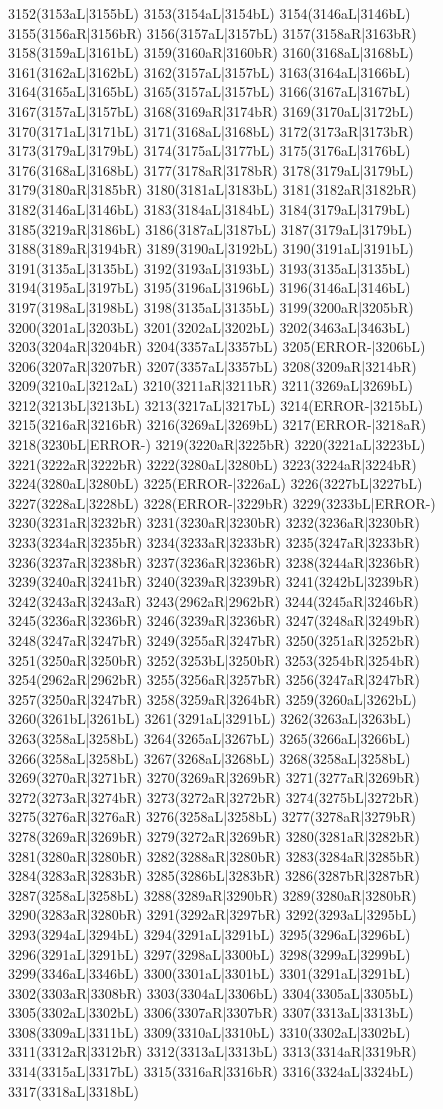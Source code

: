 3152(3153aL|3155bL) 3153(3154aL|3154bL) 3154(3146aL|3146bL) 3155(3156aR|3156bR) 3156(3157aL|3157bL) 3157(3158aR|3163bR) 3158(3159aL|3161bL) 3159(3160aR|3160bR) 3160(3168aL|3168bL) 3161(3162aL|3162bL) 3162(3157aL|3157bL) 3163(3164aL|3166bL) 3164(3165aL|3165bL) 3165(3157aL|3157bL) 3166(3167aL|3167bL) 3167(3157aL|3157bL) 3168(3169aR|3174bR) 3169(3170aL|3172bL) 3170(3171aL|3171bL) 3171(3168aL|3168bL) 3172(3173aR|3173bR) 3173(3179aL|3179bL) 3174(3175aL|3177bL) 3175(3176aL|3176bL) 3176(3168aL|3168bL) 3177(3178aR|3178bR) 3178(3179aL|3179bL) 3179(3180aR|3185bR) 3180(3181aL|3183bL) 3181(3182aR|3182bR) 3182(3146aL|3146bL) 3183(3184aL|3184bL) 3184(3179aL|3179bL) 3185(3219aR|3186bL) 3186(3187aL|3187bL) 3187(3179aL|3179bL) 3188(3189aR|3194bR) 3189(3190aL|3192bL) 3190(3191aL|3191bL) 3191(3135aL|3135bL) 3192(3193aL|3193bL) 3193(3135aL|3135bL) 3194(3195aL|3197bL) 3195(3196aL|3196bL) 3196(3146aL|3146bL) 3197(3198aL|3198bL) 3198(3135aL|3135bL) 3199(3200aR|3205bR) 3200(3201aL|3203bL) 3201(3202aL|3202bL) 3202(3463aL|3463bL) 3203(3204aR|3204bR) 3204(3357aL|3357bL) 3205(ERROR-|3206bL) 3206(3207aR|3207bR) 3207(3357aL|3357bL) 3208(3209aR|3214bR) 3209(3210aL|3212aL) 3210(3211aR|3211bR) 3211(3269aL|3269bL) 3212(3213bL|3213bL) 3213(3217aL|3217bL) 3214(ERROR-|3215bL) 3215(3216aR|3216bR) 3216(3269aL|3269bL) 3217(ERROR-|3218aR) 3218(3230bL|ERROR-) 3219(3220aR|3225bR) 3220(3221aL|3223bL) 3221(3222aR|3222bR) 3222(3280aL|3280bL) 3223(3224aR|3224bR) 3224(3280aL|3280bL) 3225(ERROR-|3226aL) 3226(3227bL|3227bL) 3227(3228aL|3228bL) 3228(ERROR-|3229bR) 3229(3233bL|ERROR-) 3230(3231aR|3232bR) 3231(3230aR|3230bR) 3232(3236aR|3230bR) 3233(3234aR|3235bR) 3234(3233aR|3233bR) 3235(3247aR|3233bR) 3236(3237aR|3238bR) 3237(3236aR|3236bR) 3238(3244aR|3236bR) 3239(3240aR|3241bR) 3240(3239aR|3239bR) 3241(3242bL|3239bR) 3242(3243aR|3243aR) 3243(2962aR|2962bR) 3244(3245aR|3246bR) 3245(3236aR|3236bR) 3246(3239aR|3236bR) 3247(3248aR|3249bR) 3248(3247aR|3247bR) 3249(3255aR|3247bR) 3250(3251aR|3252bR) 3251(3250aR|3250bR) 3252(3253bL|3250bR) 3253(3254bR|3254bR) 3254(2962aR|2962bR) 3255(3256aR|3257bR) 3256(3247aR|3247bR) 3257(3250aR|3247bR) 3258(3259aR|3264bR) 3259(3260aL|3262bL) 3260(3261bL|3261bL) 3261(3291aL|3291bL) 3262(3263aL|3263bL) 3263(3258aL|3258bL) 3264(3265aL|3267bL) 3265(3266aL|3266bL) 3266(3258aL|3258bL) 3267(3268aL|3268bL) 3268(3258aL|3258bL) 3269(3270aR|3271bR) 3270(3269aR|3269bR) 3271(3277aR|3269bR) 3272(3273aR|3274bR) 3273(3272aR|3272bR) 3274(3275bL|3272bR) 3275(3276aR|3276aR) 3276(3258aL|3258bL) 3277(3278aR|3279bR) 3278(3269aR|3269bR) 3279(3272aR|3269bR) 3280(3281aR|3282bR) 3281(3280aR|3280bR) 3282(3288aR|3280bR) 3283(3284aR|3285bR) 3284(3283aR|3283bR) 3285(3286bL|3283bR) 3286(3287bR|3287bR) 3287(3258aL|3258bL) 3288(3289aR|3290bR) 3289(3280aR|3280bR) 3290(3283aR|3280bR) 3291(3292aR|3297bR) 3292(3293aL|3295bL) 3293(3294aL|3294bL) 3294(3291aL|3291bL) 3295(3296aL|3296bL) 3296(3291aL|3291bL) 3297(3298aL|3300bL) 3298(3299aL|3299bL) 3299(3346aL|3346bL) 3300(3301aL|3301bL) 3301(3291aL|3291bL) 3302(3303aR|3308bR) 3303(3304aL|3306bL) 3304(3305aL|3305bL) 3305(3302aL|3302bL) 3306(3307aR|3307bR) 3307(3313aL|3313bL) 3308(3309aL|3311bL) 3309(3310aL|3310bL) 3310(3302aL|3302bL) 3311(3312aR|3312bR) 3312(3313aL|3313bL) 3313(3314aR|3319bR) 3314(3315aL|3317bL) 3315(3316aR|3316bR) 3316(3324aL|3324bL) 3317(3318aL|3318bL) 